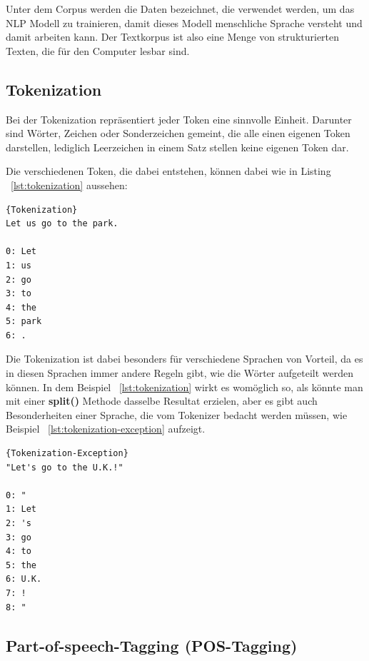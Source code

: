 Unter dem Corpus werden die Daten bezeichnet, die verwendet werden, um das NLP Modell zu trainieren, damit dieses Modell menschliche Sprache versteht und damit arbeiten kann.
Der Textkorpus ist also eine Menge von strukturierten Texten, die für den Computer lesbar sind.\cite{corpus}


\subsection{Tokenization}

Bei der Tokenization repräsentiert jeder Token eine sinnvolle Einheit.
Darunter sind Wörter, Zeichen oder Sonderzeichen gemeint, die alle einen eigenen Token darstellen, lediglich Leerzeichen in einem Satz stellen keine eigenen Token dar.\cite{machineLearningTextAnalysis, naturalLanguageProcessing}

Die verschiedenen Token, die dabei entstehen, können dabei wie in Listing ~\ref{lst:tokenization} aussehen:

\begin{lstlisting}[label={lst:tokenization},caption={Beispiel für die Tokenization}]{Tokenization}
Let us go to the park.

0: Let
1: us
2: go
3: to
4: the
5: park
6: .
\end{lstlisting}

Die Tokenization ist dabei besonders für verschiedene Sprachen von Vorteil, da es in diesen Sprachen immer andere Regeln gibt, wie die Wörter aufgeteilt werden können.
In dem Beispiel ~\ref{lst:tokenization} wirkt es womöglich so, als könnte man mit einer \textbf{split()} Methode dasselbe Resultat erzielen, aber es gibt auch Besonderheiten einer Sprache, die vom Tokenizer bedacht werden müssen, wie Beispiel ~\ref{lst:tokenization-exception} aufzeigt.\cite{machineLearningTextAnalysis, naturalLanguageProcessing}

\begin{lstlisting}[label={lst:tokenization-exception},caption={Ausnahme für bestimmte Tokens}]{Tokenization-Exception}
"Let's go to the U.K.!"

0: "
1: Let
2: 's
3: go
4: to
5: the
6: U.K.
7: !
8: "
\end{lstlisting}

\subsection{Part-of-speech-Tagging (POS-Tagging)}


